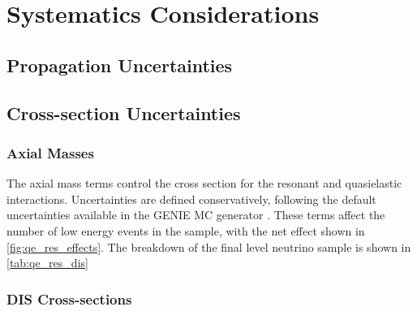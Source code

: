 \section{Systematics Considerations}

\label{subsec:oscillation_params}




\label{subsec:propagation_systematics}
\subsection{Propagation Uncertainties}

\label{subsec:xsec_systematics}
\subsection{Cross-section Uncertainties}

\label{subsubsec:axial_masses}
\subsubsection{Axial Masses}
The axial mass terms control the cross section for the resonant and quasielastic interactions. 
Uncertainties are defined conservatively, following the default uncertainties available in the GENIE MC generator .
These terms affect the number of low energy events in the sample, with the net effect shown in \ref{fig:qe_res_effects}. 
The breakdown of the final level neutrino sample is shown in \ref{tab:qe_res_dis}

\label{subsubsec:dis_systematics}
\subsubsection{DIS Cross-sections}

\label{subsec:detector_systematics}
